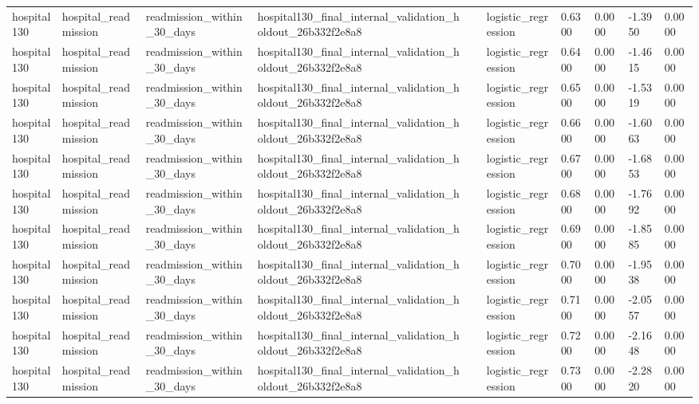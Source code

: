 \begin{tabular}{llllllllll}
hospital130 & hospital\_readmission & readmission\_within\_30\_days & hospital130\_final\_internal\_validation\_holdout\_26b332f2e8a8 &  & logistic\_regression & 0.6300 & 0.0000 & -1.3950 & 0.0000 \\
hospital130 & hospital\_readmission & readmission\_within\_30\_days & hospital130\_final\_internal\_validation\_holdout\_26b332f2e8a8 &  & logistic\_regression & 0.6400 & 0.0000 & -1.4615 & 0.0000 \\
hospital130 & hospital\_readmission & readmission\_within\_30\_days & hospital130\_final\_internal\_validation\_holdout\_26b332f2e8a8 &  & logistic\_regression & 0.6500 & 0.0000 & -1.5319 & 0.0000 \\
hospital130 & hospital\_readmission & readmission\_within\_30\_days & hospital130\_final\_internal\_validation\_holdout\_26b332f2e8a8 &  & logistic\_regression & 0.6600 & 0.0000 & -1.6063 & 0.0000 \\
hospital130 & hospital\_readmission & readmission\_within\_30\_days & hospital130\_final\_internal\_validation\_holdout\_26b332f2e8a8 &  & logistic\_regression & 0.6700 & 0.0000 & -1.6853 & 0.0000 \\
hospital130 & hospital\_readmission & readmission\_within\_30\_days & hospital130\_final\_internal\_validation\_holdout\_26b332f2e8a8 &  & logistic\_regression & 0.6800 & 0.0000 & -1.7692 & 0.0000 \\
hospital130 & hospital\_readmission & readmission\_within\_30\_days & hospital130\_final\_internal\_validation\_holdout\_26b332f2e8a8 &  & logistic\_regression & 0.6900 & 0.0000 & -1.8585 & 0.0000 \\
hospital130 & hospital\_readmission & readmission\_within\_30\_days & hospital130\_final\_internal\_validation\_holdout\_26b332f2e8a8 &  & logistic\_regression & 0.7000 & 0.0000 & -1.9538 & 0.0000 \\
hospital130 & hospital\_readmission & readmission\_within\_30\_days & hospital130\_final\_internal\_validation\_holdout\_26b332f2e8a8 &  & logistic\_regression & 0.7100 & 0.0000 & -2.0557 & 0.0000 \\
hospital130 & hospital\_readmission & readmission\_within\_30\_days & hospital130\_final\_internal\_validation\_holdout\_26b332f2e8a8 &  & logistic\_regression & 0.7200 & 0.0000 & -2.1648 & 0.0000 \\
hospital130 & hospital\_readmission & readmission\_within\_30\_days & hospital130\_final\_internal\_validation\_holdout\_26b332f2e8a8 &  & logistic\_regression & 0.7300 & 0.0000 & -2.2820 & 0.0000 \\

\end{tabular}
